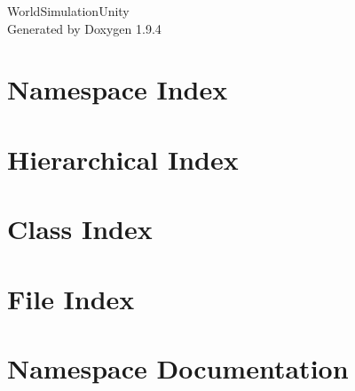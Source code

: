 \documentclass[twoside]{book}
\newcommand{\+}{\discretionary{\mbox{\scriptsize$\hookleftarrow$}}{}{}}
\newcommand{\clearemptydoublepage}{%
    \newpage{\pagestyle{empty}\cleardoublepage}%
  }
\begin{document}
  \raggedbottom
    \hypersetup{pageanchor=false,
                bookmarksnumbered=true,
                pdfencoding=unicode
               }
  \begin{titlepage}
  \vspace*{7cm}
  \begin{center}%
  {\Large World\+Simulation\+Unity}\\
  \vspace*{1cm}
  {\large Generated by Doxygen 1.9.4}\\
  \end{center}
  \end{titlepage}
  \clearemptydoublepage
  \tableofcontents
  \clearemptydoublepage
  \hypersetup{pageanchor=true}
\chapter{Namespace Index}

\chapter{Hierarchical Index}

\chapter{Class Index}

\chapter{File Index}

\chapter{Namespace Documentation}


















\end{document}
